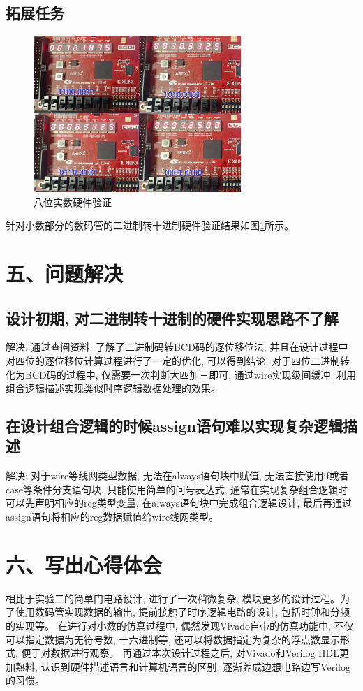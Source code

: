 \documentclass{article}
\newcommand{\fourhao}{\fontsize{14pt}{\baselineskip}\selectfont} %
\newcommand{\xiaosihao}{\fontsize{12pt}{\baselineskip}\selectfont} %
\begin{document}
\subsection*{拓展任务}
\begin{figure}[H]
    \centering
    \includegraphics[width=0.7\textwidth]{image/2024-06-16-22-29-35.png}
    \caption{八位实数硬件验证}
    \label{image_real_hardware}
\end{figure}
针对小数部分的数码管的二进制转十进制硬件验证结果如图\ref{image_real_hardware}所示。
\section*{\fourhao 五、问题解决}
\xiaosihao
{}
\subsection*{设计初期, 对二进制转十进制的硬件实现思路不了解}
解决: 通过查阅资料, 了解了二进制码转BCD码的逐位移位法, 并且在设计过程中对四位的逐位移位计算过程进行了一定的优化, 可以得到结论, 
对于四位二进制转化为BCD码的过程中, 仅需要一次判断大四加三即可, 通过wire实现级间缓冲, 利用组合逻辑描述实现类似时序逻辑数据处理的效果。
\subsection*{在设计组合逻辑的时候assign语句难以实现复杂逻辑描述}
解决: 对于wire等线网类型数据, 无法在always语句块中赋值, 无法直接使用if或者case等条件分支语句块, 只能使用简单的问号表达式, 
通常在实现复杂组合逻辑时可以先声明相应的reg类型变量, 在always语句块中完成组合逻辑设计, 最后再通过assign语句将相应的reg数据赋值给wire线网类型。
\section*{\fourhao 六、写出心得体会}
\xiaosihao
相比于实验二的简单门电路设计, 进行了一次稍微复杂, 模块更多的设计过程。为了使用数码管实现数据的输出, 提前接触了时序逻辑电路的设计, 包括时钟和分频的实现等。
在进行对小数的仿真过程中, 偶然发现Vivado自带的仿真功能中, 不仅可以指定数据为无符号数, 十六进制等, 还可以将数据指定为复杂的浮点数显示形式, 便于对数据进行观察。
再通过本次设计过程之后, 对Vivado和Verilog HDL更加熟料, 认识到硬件描述语言和计算机语言的区别, 逐渐养成边想电路边写Verilog的习惯。
\end{document}
